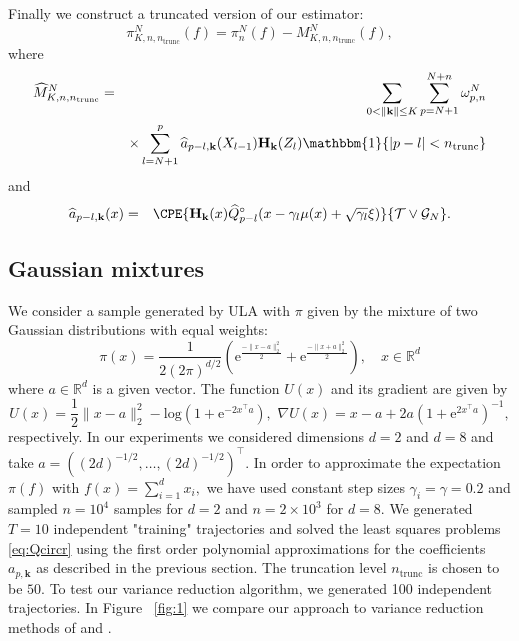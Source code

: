 \documentclass[bj]{imsart}
\def\rme{\mathrm{e}}
\def\NtrainPath{T}
\def\TrainSet{\mathcal{T}}
\begin{document}
Finally  we construct a truncated version of our estimator:
\[
\pi_{K,n,n_{\mathrm{trunc}}}^N(f) = \pi_n^N(f) -  M_{K,n, n_{\mathrm{trunc}}}^{N}(f),
\]
where
\begin{eqnarray*}
{\widehat  M}_{K,n, n_{\mathrm{trunc}}}^N &=& \sum_{0<\left\| \mathbf{k}\right\| \leq K} \sum_{p=N+1}^{N+n} \omega_{p,n}^N
\\
&&\times
\sum_{l=N+1}^p {\widehat  a}_{p-l,\mathbf{k}}(X_{l-1})\mathbf{H}_{\mathbf{k}}(Z_l) \mathbbm{1}\{ |p-l| < n_{\mathrm{trunc}} \}
\end{eqnarray*}
and
\begin{eqnarray*}
\widehat a_{p-l,\mathbf{k}} (x) &=&\CPE{\mathbf{H}_\mathbf{k}(x) \widehat{Q}^\circ_{p-l}(x - \gamma_l \mu(x) + \sqrt{\gamma_l}\xi)}{\TrainSet \vee \mathcal{G}_N}.
\end{eqnarray*}
\subsection{Gaussian mixtures}
 We consider a sample generated by ULA with $\pi$  given by the mixture of two Gaussian distributions  with equal weights:
\[
\pi (x) = \frac{1}{2(2\pi)^{d/2}} \left( \rme^{\frac{-\| x-a\|_2^2}{2}}  + \rme^{\frac{-\| x+a\|_2^2}{2}} \right), \quad x \in\mathbb R^d
\]
where $a \in \mathbb{R}^d$ is a given vector. The function $U(x)$ and its gradient are given by
\[
U(x) = \frac{1}{2} \|x - a\|_2^2 - \text{log}(1 + \rme^{-2x^\top a}), \,\,
\nabla U(x) = x-a +2a(1 + \rme^{2 x^\top a})^{-1},
\]
respectively.
In our experiments we considered dimensions $d = 2$ and $d = 8$ and take $a=( (2d)^{-1/2}, \dots, (2d)^{-1/2})^\top$.
In order to approximate the expectation \(\pi(f)\) with \(f(x)=\sum_{i=1}^d x_i,\)
 we have used constant step sizes $\gamma_i = \gamma=0.2$ and sampled $n = 10^4$ samples for $d = 2$ and $n = 2 \times 10^3$ for $d = 8$.  We generated $\NtrainPath = 10$ independent "training" trajectories and solved the least squares  problems \eqref{eq:Qcircr} using the first order polynomial approximations for the coefficients \(a_{p,\mathbf{k}}\) as described in the previous section. The truncation level \(n_{\mathrm{trunc}}\) is chosen to be \(50.\) To test our variance reduction algorithm, we generated 100 independent trajectories.
 In Figure ~\ref{fig:1} we compare our approach to variance reduction methods of \cite{mira2013zero} and \cite{brosse2018diffusion}.
\end{document}
